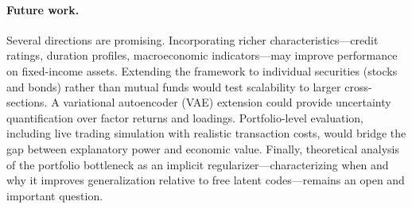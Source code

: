 \paragraph{Future work.} Several directions are promising. Incorporating richer characteristics---credit ratings, duration profiles, macroeconomic indicators---may improve performance on fixed-income assets. Extending the framework to individual securities (stocks and bonds) rather than mutual funds would test scalability to larger cross-sections. A variational autoencoder (VAE) extension \citep{Duan2022factorvae} could provide uncertainty quantification over factor returns and loadings. Portfolio-level evaluation, including live trading simulation with realistic transaction costs, would bridge the gap between explanatory power and economic value. Finally, theoretical analysis of the portfolio bottleneck as an implicit regularizer---characterizing when and why it improves generalization relative to free latent codes---remains an open and important question.
